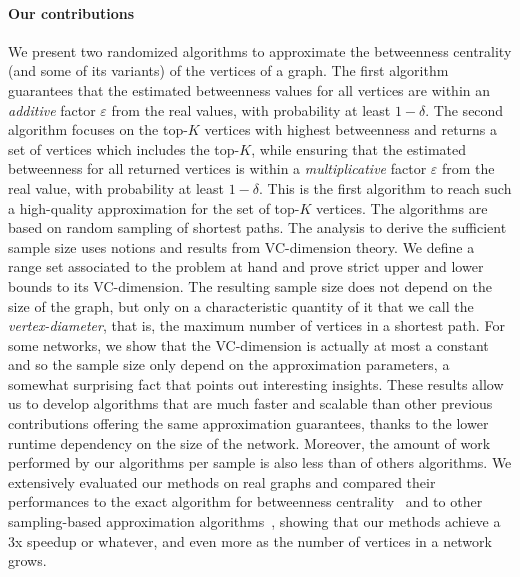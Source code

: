 \paragraph{Our contributions} 
We present two randomized algorithms to approximate the betweenness centrality
(and some of its variants) of the vertices of a graph. The first algorithm
guarantees that the estimated betweenness values for all vertices are within an
\emph{additive} factor $\varepsilon$ from the real values, with probability at
least $1-\delta$. The second algorithm focuses on the top-$K$ vertices with
highest betweenness and returns a set of vertices which includes the top-$K$,
while ensuring that the estimated betweenness for all returned vertices is
within a \emph{multiplicative} factor $\varepsilon$ from the real value, with
probability at least $1-\delta$. This is the first algorithm to reach such a
high-quality approximation for the set of top-$K$ vertices. The algorithms are
based on random sampling of shortest paths. The analysis to derive the
sufficient sample size uses notions and results from VC-dimension theory. We
define a range set associated to the problem at hand and prove strict upper and
lower bounds to its VC-dimension. The resulting sample size does not depend on
the size of the graph, but only on a characteristic quantity of it that we call
the \emph{vertex-diameter}, that is, the maximum number of vertices in a
shortest path. For some networks, we show that the VC-dimension is actually at
most a constant and so the sample size only depend on the approximation
parameters, a somewhat surprising fact that points out interesting insights.
These results allow us to develop algorithms that are much faster and scalable
than other previous contributions offering the same approximation guarantees,
thanks to the lower runtime dependency on the size of the network.  Moreover,
the amount of work performed by our algorithms per sample is also less than of
others algorithms. We extensively evaluated our methods on real graphs and
compared their performances to the exact algorithm for betweenness
centrality~\citep{Brandes01} and to other sampling-based approximation
algorithms~\citep{BrandesP07,GeisbergerSS08}, showing that our methods achieve a
3x speedup \XXX or whatever, and even more as the number of vertices in a
network grows.

